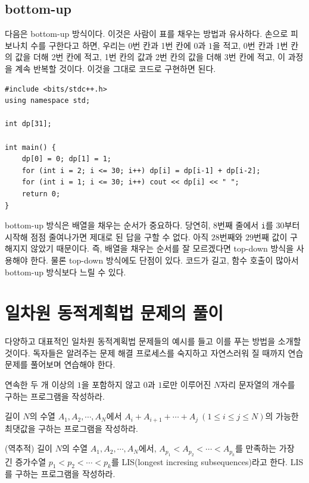 \subsection{bottom-up}
다음은 bottom-up 방식이다. 이것은 사람이 표를 채우는 방법과 유사하다. 손으로 피보나치 수를 구한다고 하면, 우리는 0번 칸과 1번 칸에 $0$과 $1$을 적고, 0번 칸과 1번 칸의 값을 더해 2번 칸에 적고, 1번 칸의 값과 2번 칸의 값을 더해 3번 칸에 적고, 이 과정을 계속 반복할 것이다. 이것을 그대로 코드로 구현하면 된다.

\begin{lstlisting}
#include <bits/stdc++.h>
using namespace std;

int dp[31];

int main() {
    dp[0] = 0; dp[1] = 1;
    for (int i = 2; i <= 30; i++) dp[i] = dp[i-1] + dp[i-2];
    for (int i = 1; i <= 30; i++) cout << dp[i] << " ";
    return 0;
}
\end{lstlisting}

bottom-up 방식은 배열을 채우는 순서가 중요하다. 당연히, 8번째 줄에서 \texttt{i}를 $30$부터 시작해 점점 줄여나가면 제대로 된 답을 구할 수 없다. 아직 $28$번째와 $29$번째 값이 구해지지 않았기 때문이다. 즉, 배열을 채우는 순서를 잘 모르겠다면 top-down 방식을 사용해야 한다. 물론 top-down 방식에도 단점이 있다. 코드가 길고, 함수 호출이 많아서 bottom-up 방식보다 느릴 수 있다.

\section{일차원 동적계획법 문제의 풀이}

다양하고 대표적인 일차원 동적계획법 문제들의 예시를 들고 이를 푸는 방법을 소개할 것이다. 독자들은 알려주는 문제 해결 프로세스를 숙지하고 자연스러워 질 때까지 연습문제를 풀어보며 연습해야 한다.

\begin{example}
    연속한 두 개 이상의 $1$을 포함하지 않고 $0$과 $1$로만 이루어진 $N$자리 문자열의 개수를 구하는 프로그램을 작성하라.
\end{example}



\begin{example}
    길이 $N$의 수열 $A_1, A_2, \cdots, A_N$에서 $A_i + A_{i+1} + \cdots + A_{j}~(1 \leq i \leq j \leq N)$의 가능한 최댓값을 구하는 프로그램을 작성하라.
\end{example}

\begin{example}
    (역추적) 길이 $N$의 수열 $A_1, A_2, \cdots, A_N$에서, $A_{p_1} < A_{p_2} < \cdots < A_{p_k}$를 만족하는 가장 긴 증가수열 $p_1 < p_2 < \cdots < p_k$를 LIS(longest incresing subsequences)라고 한다. LIS를 구하는 프로그램을 작성하라.
\end{example}

